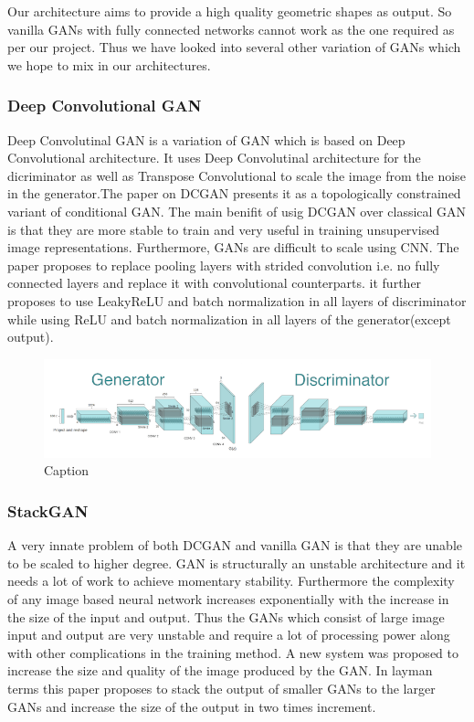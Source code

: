 \documentclass{article}
\begin{document}
Our architecture aims to provide a high quality geometric shapes as output. So vanilla GANs with fully connected networks cannot work as the one required as per our project. Thus we have looked into several other variation of GANs which we hope to mix in our architectures.

\subsubsection{Deep Convolutional GAN}
Deep Convolutinal GAN is a variation of GAN which is based on Deep Convolutional architecture. It uses Deep Convolutinal architecture for the dicriminator as well as Transpose Convolutional to scale the image from the noise in the generator.The paper on DCGAN presents it as a topologically constrained variant of conditional GAN. The main benifit of usig DCGAN over classical GAN is that they are more stable to train and very useful in training unsupervised image representations. Furthermore, GANs are difficult to scale using CNN. The paper proposes to replace pooling layers with strided convolution i.e. no fully connected layers and replace it with convolutional counterparts. it further proposes to use LeakyReLU and batch normalization in all layers of discriminator while using ReLU and batch normalization in all layers of the generator(except output).
\begin{figure}
    \centering
    \includegraphics[width=15cm]{images/GAN/DCGAN.png}
    \caption{Caption}
    \label{Architecture of Deep Learning GAN}
\end{figure}

\subsubsection{StackGAN}
A very innate problem of both DCGAN and vanilla GAN is that they are unable to be scaled to higher degree. GAN is structurally an unstable architecture and it needs a lot of work to achieve momentary stability. Furthermore the complexity of any image based neural network increases exponentially with the increase in the size of the input and output. Thus the GANs which consist of large image input and output are very unstable and require a lot of processing power along with other complications in the training method. A new system was proposed to increase the size and quality of the image produced by the GAN. In layman terms this paper proposes to stack the output of smaller GANs to the larger GANs and increase the size of the output in two times increment.
\end{document}

